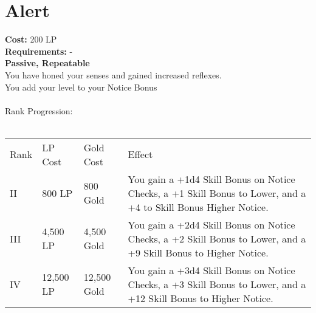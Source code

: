 \section{Alert}\label{perk:alert}
\textbf{Cost:} 200 LP\\
\textbf{Requirements:} -\\
\textbf{Passive, Repeatable}\\
You have honed your senses and gained increased reflexes.\\
You add your level to your Notice Bonus\\
\\
Rank Progression:\\
\\
\begin{longtable}{l | l | l | p{9cm}}
	Rank & LP Cost & Gold Cost & Effect\\
	II & 800 LP & 800 Gold & You gain a +1d4 Skill Bonus on Notice Checks, a +1 Skill Bonus to Lower, and a +4 to Skill Bonus Higher Notice.\\
	III & 4,500 LP & 4,500 Gold & You gain a +2d4 Skill Bonus on Notice Checks, a +2 Skill Bonus to Lower, and a +9 Skill Bonus to Higher Notice.\\
	IV & 12,500 LP & 12,500 Gold & You gain a +3d4 Skill Bonus on Notice Checks, a +3 Skill Bonus to Lower, and a +12 Skill Bonus to Higher Notice.\\
\end{longtable}

